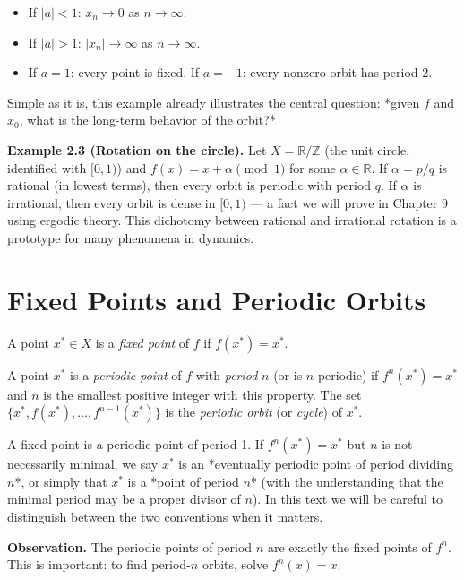 \begin{itemize}[nosep]
  \item If $|a| < 1$: $x_n \to 0$ as $n \to \infty$.
  \item If $|a| > 1$: $|x_n| \to \infty$ as $n \to \infty$.
  \item If $a = 1$: every point is fixed. If $a = -1$: every nonzero orbit has period 2.
\end{itemize}

Simple as it is, this example already illustrates the central question: *given $f$ and $x_0$, what is the long-term behavior of the orbit?*

\textbf{Example 2.3 (Rotation on the circle).} Let $X = \mathbb{R}/\mathbb{Z}$ (the unit circle, identified with $[0,1)$) and $f(x) = x + \alpha \pmod{1}$ for some $\alpha \in \mathbb{R}$. If $\alpha = p/q$ is rational (in lowest terms), then every orbit is periodic with period $q$. If $\alpha$ is irrational, then every orbit is dense in $[0,1)$ --- a fact we will prove in Chapter 9 using ergodic theory. This dichotomy between rational and irrational rotation is a prototype for many phenomena in dynamics.


\section{Fixed Points and Periodic Orbits}\label{sec:2.2}

\begin{definition}\label{def:2.4.}
A point $x^* \in X$ is a \textit{fixed point} of $f$ if $f(x^*) = x^*$.
\end{definition}


\begin{definition}\label{def:2.5.}
A point $x^*$ is a \textit{periodic point} of $f$ with \textit{period} $n$ (or is $n$-periodic) if $f^n(x^*) = x^*$ and $n$ is the smallest positive integer with this property. The set $\{x^*, f(x^*), \ldots, f^{n-1}(x^*)\}$ is the \textit{periodic orbit} (or \textit{cycle}) of $x^*$.

A fixed point is a periodic point of period 1. If $f^n(x^*) = x^*$ but $n$ is not necessarily minimal, we say $x^*$ is an *eventually periodic point of period dividing $n$*, or simply that $x^*$ is a *point of period $n$* (with the understanding that the minimal period may be a proper divisor of $n$). In this text we will be careful to distinguish between the two conventions when it matters.

\textbf{Observation.} The periodic points of period $n$ are exactly the fixed points of $f^n$. This is important: to find period-$n$ orbits, solve $f^n(x) = x$.
\end{definition}


